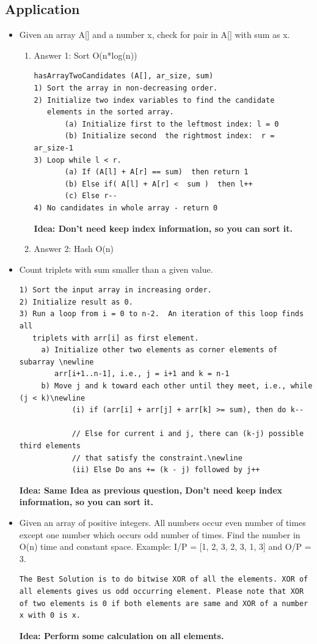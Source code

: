 \documentclass[a4paper,12pt,twoside]{book}
\begin{document}
\subsection{Application}
\begin{itemize}

\item Given an array A[] and a number x, check for pair in A[] with sum as x. 
\begin{enumerate}
\item Answer 1: Sort O(n*log(n))
\begin{lstlisting}[breaklines]
hasArrayTwoCandidates (A[], ar_size, sum)
1) Sort the array in non-decreasing order.
2) Initialize two index variables to find the candidate 
   elements in the sorted array.
       (a) Initialize first to the leftmost index: l = 0
       (b) Initialize second  the rightmost index:  r = ar_size-1
3) Loop while l < r.
       (a) If (A[l] + A[r] == sum)  then return 1
       (b) Else if( A[l] + A[r] <  sum )  then l++
       (c) Else r--    
4) No candidates in whole array - return 0
\end{lstlisting}
\textbf{Idea: Don't need keep index information, so you can sort it. }
\item Answer 2: Hash O(n)
\end{enumerate}

\item Count triplets with sum smaller than a given value. 
\begin{lstlisting}[breaklines]
1) Sort the input array in increasing order. 
2) Initialize result as 0.
3) Run a loop from i = 0 to n-2.  An iteration of this loop finds all
   triplets with arr[i] as first element.
     a) Initialize other two elements as corner elements of subarray \newline
        arr[i+1..n-1], i.e., j = i+1 and k = n-1
     b) Move j and k toward each other until they meet, i.e., while (j < k)\newline
            (i) if (arr[i] + arr[j] + arr[k] >= sum), then do k-- 

            // Else for current i and j, there can (k-j) possible third elements 
            // that satisfy the constraint.\newline
            (ii) Else Do ans += (k - j) followed by j++ 
\end{lstlisting}
\textbf{Idea: Same Idea as previous question, Don't need keep index information, so you can sort it. }


\item Given an array of positive integers. All numbers occur even number of times except one number which occurs odd number of times. Find the number in O(n) time and constant space.
Example: I/P = [1, 2, 3, 2, 3, 1, 3] and O/P = 3. 
\begin{lstlisting}[breaklines]
The Best Solution is to do bitwise XOR of all the elements. XOR of all elements gives us odd occurring element. Please note that XOR of two elements is 0 if both elements are same and XOR of a number x with 0 is x.
\end{lstlisting}
\textbf{Idea: Perform some calculation on all elements. }



\end{itemize}
\end{document}
